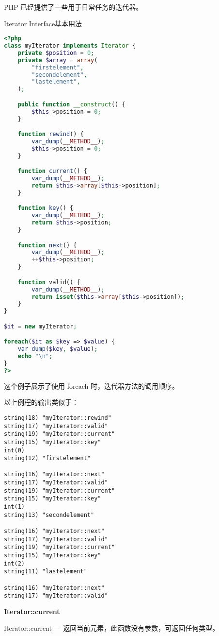 PHP 已经提供了一些用于日常任务的迭代器。

\begin{example}
Iterator Interface基本用法
\begin{lstlisting}[language=PHP]
<?php
class myIterator implements Iterator {
    private $position = 0;
    private $array = array(
        "firstelement",
        "secondelement",
        "lastelement",
    );  

    public function __construct() {
        $this->position = 0;
    }

    function rewind() {
        var_dump(__METHOD__);
        $this->position = 0;
    }

    function current() {
        var_dump(__METHOD__);
        return $this->array[$this->position];
    }

    function key() {
        var_dump(__METHOD__);
        return $this->position;
    }

    function next() {
        var_dump(__METHOD__);
        ++$this->position;
    }

    function valid() {
        var_dump(__METHOD__);
        return isset($this->array[$this->position]);
    }
}

$it = new myIterator;

foreach($it as $key => $value) {
    var_dump($key, $value);
    echo "\n";
}
?>
\end{lstlisting}
\end{example}

这个例子展示了使用 foreach 时，迭代器方法的调用顺序。

以上例程的输出类似于：

\begin{verbatim}
string(18) "myIterator::rewind"
string(17) "myIterator::valid"
string(19) "myIterator::current"
string(15) "myIterator::key"
int(0)
string(12) "firstelement"

string(16) "myIterator::next"
string(17) "myIterator::valid"
string(19) "myIterator::current"
string(15) "myIterator::key"
int(1)
string(13) "secondelement"

string(16) "myIterator::next"
string(17) "myIterator::valid"
string(19) "myIterator::current"
string(15) "myIterator::key"
int(2)
string(11) "lastelement"

string(16) "myIterator::next"
string(17) "myIterator::valid"
\end{verbatim}


\textbf{Iterator::current}

Iterator::current — 返回当前元素，此函数没有参数，可返回任何类型。



